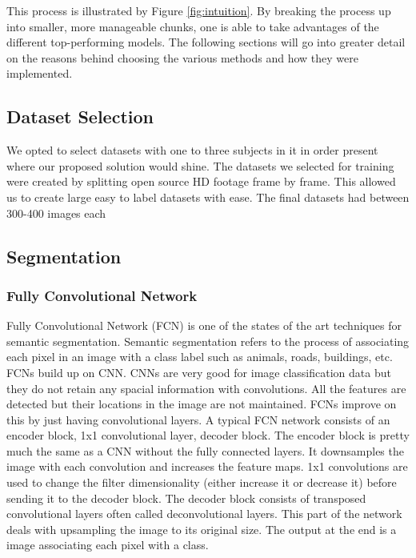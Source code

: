 This process is illustrated by Figure \ref{fig:intuition}. By breaking the process up into smaller, more manageable chunks, one is able to take advantages of the different top-performing models. The following sections will go into greater detail on the reasons behind choosing the various methods and how they were implemented.

\subsection{Dataset Selection}

We opted to select datasets with one to three subjects in it in order present
where our proposed solution would shine. The datasets we selected for training
were created by splitting open source HD footage frame by frame. This allowed us
to create large easy to label datasets with ease. The final datasets had between 
300-400 images each

\subsection{Segmentation}
\subsubsection*{Fully Convolutional Network}

Fully Convolutional Network (FCN) is one of the states of the art techniques for
semantic segmentation. Semantic segmentation \cite{Liu2018} refers to the process of
associating each pixel in an image with a class label such as animals, roads,
buildings, etc. FCNs build up on CNN. CNNs are very good for image
classification data but they do not retain any spacial information with
convolutions. All the features are detected but their locations in the image are
not maintained. FCNs improve on this by just having convolutional layers. A
typical FCN network consists of an encoder block, 1x1 convolutional layer,
decoder block. The encoder block is pretty much the same as a CNN without the
fully connected layers. It downsamples the image with each convolution and
increases the feature maps. 1x1 convolutions are used to change the filter
dimensionality (either increase it or decrease it) before sending it to the
decoder block. The decoder block consists of transposed convolutional layers
often called deconvolutional layers. This part of the network deals with
upsampling the image to its original size. The output at the end is a image
associating each pixel with a class.

